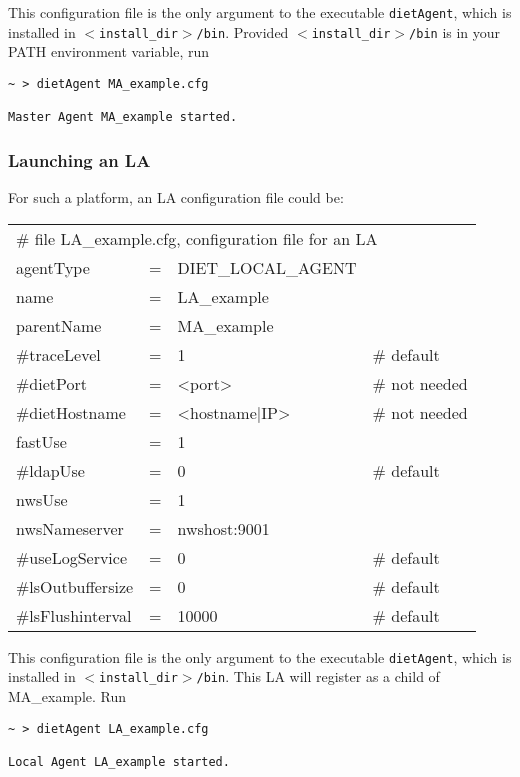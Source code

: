 This configuration file is the only argument to the executable
\texttt{dietAgent}, which is installed in
\texttt{$<$install\_dir$>$/bin}. Provided
\texttt{$<$install\_dir$>$/bin} is in your PATH environment variable, run
{\footnotesize
\begin{verbatim}
~ > dietAgent MA_example.cfg

Master Agent MA_example started.
\end{verbatim}
}


\subsubsection{Launching an LA}

For such a platform, an LA configuration file could be:
\tt
\begin{center}
 \footnotesize
 \begin{tabular}{lcll}
  \multicolumn{4}{l}{\# file LA\_example.cfg, configuration file for an LA}\\
  agentType    &=&DIET\_LOCAL\_AGENT&\\
  name         &=&LA\_example       &\\
  parentName   &=&MA\_example       &\\
  \#traceLevel &=&1                 &\# default\\
  \#dietPort    &=&<port>             &\# not needed\\
  \#dietHostname&=&<hostname|IP>      &\# not needed\\
  fastUse    &=&1                 &\\
  \#ldapUse    &=&0                 &\# default\\
  nwsUse     &=&1                 &\\
  nwsNameserver&=&nwshost:9001      &\\
  \#useLogService &=& 0               &\# default\\
  \#lsOutbuffersize &=& 0             &\# default\\
  \#lsFlushinterval &=& 10000           &\# default\\
 \end{tabular}
\end{center}
\rm

This configuration file is the only argument to the executable
\texttt{dietAgent}, which is installed in \texttt{$<$install\_dir$>$/bin}. This
LA will register as a child of MA\_example. Run {\footnotesize
\begin{verbatim}
~ > dietAgent LA_example.cfg

Local Agent LA_example started.

\end{verbatim}
}

